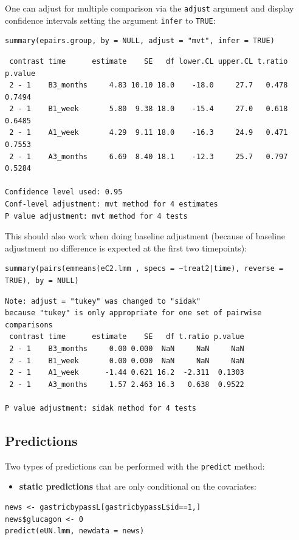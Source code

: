 \documentclass[12pt]{article}
\begin{document}
One can adjust for multiple comparison via the \texttt{adjust} argument and
display confidence intervals setting the argument \texttt{infer} to \texttt{TRUE}:
\lstset{language=r,label= ,caption= ,captionpos=b,numbers=none}
\begin{lstlisting}
summary(epairs.group, by = NULL, adjust = "mvt", infer = TRUE)
\end{lstlisting}

\begin{verbatim}
 contrast time      estimate    SE   df lower.CL upper.CL t.ratio p.value
 2 - 1    B3_months     4.83 10.10 18.0    -18.0     27.7   0.478  0.7494
 2 - 1    B1_week       5.80  9.38 18.0    -15.4     27.0   0.618  0.6485
 2 - 1    A1_week       4.29  9.11 18.0    -16.3     24.9   0.471  0.7553
 2 - 1    A3_months     6.69  8.40 18.1    -12.3     25.7   0.797  0.5284

Confidence level used: 0.95 
Conf-level adjustment: mvt method for 4 estimates 
P value adjustment: mvt method for 4 tests
\end{verbatim}


This should also work when doing baseline adjustment (because of
baseline adjustment no difference is expected at the first two
timepoints):
\lstset{language=r,label= ,caption= ,captionpos=b,numbers=none}
\begin{lstlisting}
summary(pairs(emmeans(eC2.lmm , specs = ~treat2|time), reverse = TRUE), by = NULL)
\end{lstlisting}

\begin{verbatim}
Note: adjust = "tukey" was changed to "sidak"
because "tukey" is only appropriate for one set of pairwise comparisons
 contrast time      estimate    SE   df t.ratio p.value
 2 - 1    B3_months     0.00 0.000  NaN     NaN     NaN
 2 - 1    B1_week       0.00 0.000  NaN     NaN     NaN
 2 - 1    A1_week      -1.44 0.621 16.2  -2.311  0.1303
 2 - 1    A3_months     1.57 2.463 16.3   0.638  0.9522

P value adjustment: sidak method for 4 tests
\end{verbatim}

\subsection{Predictions}
\label{sec:org6d626b9}

Two types of predictions can be performed with the \texttt{predict} method:
\begin{itemize}
\item \textbf{static predictions} that are only conditional on the covariates:
\end{itemize}
\lstset{language=r,label= ,caption= ,captionpos=b,numbers=none}
\begin{lstlisting}
news <- gastricbypassL[gastricbypassL$id==1,]
news$glucagon <- 0
predict(eUN.lmm, newdata = news)
\end{lstlisting}
\end{document}
